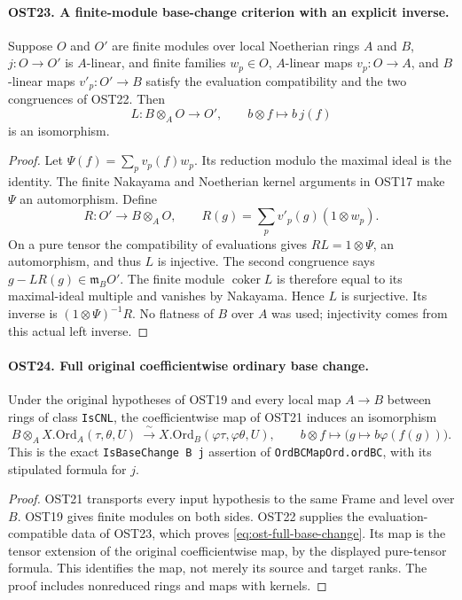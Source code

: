\documentclass[11pt,a4paper]{article}
\numberwithin{equation}{section}
\theoremstyle{remark}\newtheorem{remark}[theorem]{Remark}
\begin{document}
\paragraph{OST23. A finite-module base-change criterion with an explicit inverse.}
\label{claim:OST23}
Suppose $O$ and $O'$ are finite modules over local Noetherian
rings $A$ and $B$, $j:O\to O'$ is $A$-linear, and finite
families $w_p\in O$, $A$-linear maps $v_p:O\to A$, and
$B$-linear maps $v'_p:O'\to B$ satisfy the evaluation
compatibility and the two congruences
of OST22.  Then
\[
 L:B\otimes_A O\longrightarrow O',\qquad b\otimes f\longmapsto b\,\allowbreak{} j(f)
\]
is an isomorphism.
\begin{proof}
Let $\Psi(f)=\sum_p v_p(f)w_p$.  Its reduction modulo
the maximal ideal is the identity.  The finite Nakayama and
Noetherian kernel arguments in OST17 make $\Psi$ an
automorphism.  Define
\[
 R:O'\longrightarrow B\otimes_AO,\qquad
         R(g)=\sum_p v'_p(g)(1\otimes w_p).
\]
On a pure tensor the compatibility of evaluations gives
$RL=1\otimes\Psi$, an automorphism, and thus $L$ is
injective.  The second congruence says
$g-LR(g)\in\mathfrak m_BO'$.  The finite module
$\operatorname{coker}L$ is therefore equal to its maximal-ideal
multiple and vanishes by Nakayama.  Hence $L$ is surjective.
Its inverse is $(1\otimes\Psi)^{-1}R$.
No flatness of $B$ over $A$ was used; injectivity comes from
this actual left inverse.
\end{proof}

\paragraph{OST24. Full original coefficientwise ordinary base change.}
\label{claim:OST24}
Under the original hypotheses of OST19 and every local map
$A\to B$ between rings of class \texttt{Is\allowbreak CNL}, the
coefficientwise map of OST21 induces an isomorphism
\begin{equation}\label{eq:ost-full-base-change}
 B\otimes_A X.\mathrm{Ord}_A(\tau,\theta,\allowbreak{} U)
       \ \xrightarrow{\ \sim\ }
 X.\mathrm{Ord}_B(\varphi\tau,\varphi\theta,\allowbreak{} U),
 \qquad b\otimes f\longmapsto\bigl(g\mapsto b\varphi(f(g))\bigr).
\end{equation}
This is the exact \texttt{Is\allowbreak Base\allowbreak Change B j} assertion of
\texttt{Ord\allowbreak BCMap\allowbreak Ord.\allowbreak ord\allowbreak BC}, with its stipulated formula for $j$.
\begin{proof}
OST21 transports every input hypothesis to the same Frame
and level over $B$.  OST19 gives finite modules on both sides.
OST22 supplies the evaluation-compatible data of OST23, which
proves \eqref{eq:ost-full-base-change}.  Its map is the
tensor extension of the original coefficientwise map, by the
displayed pure-tensor formula.  This identifies the map, not
merely its source and target ranks.  The proof includes
nonreduced rings and maps with kernels.
\end{proof}
\end{document}

